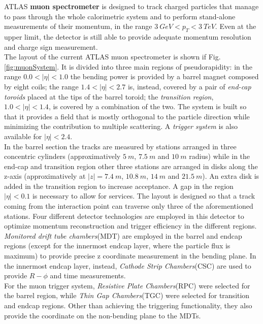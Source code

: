 \documentclass[a4paper,12pt]{article}
\begin{document}
ATLAS \textbf{muon spectrometer} is designed to track charged particles that manage to pass through the whole calorimetric system and to perform stand-alone measurements of their momentum, in the range 
$3\ GeV < p_{T} < 3\ TeV$. Even at the upper limit, the detector is still able to provide adequate momentum resolution and charge sign measurement.\\

The layout of the current  ATLAS muon spectrometer is shown if Fig. \ref{fig:muonSystem}. It is divided into three main regions of pseudorapidity: in the range $0.0 < |\eta| < 1.0$ the bending power
is provided by a barrel magnet composed by eight coils; the range $1.4 < |\eta| < 2.7$ is, instead, covered by a pair of \textit{end-cap toroids} placed at the tips of the barrel toroid; the \textit{transition
region}, $1.0 < |\eta| < 1.4$, is covered by a combination of the two. The system is built so that it provides a field that is mostly orthogonal to the particle direction while minimizing the contribution to multiple scattering. A \textit{trigger system} is also available for $|\eta| < 2.4$. \\

In the barrel section the tracks are measured by stations arranged in three concentric cylinders (approximatively $5\ m$, $7.5\ m$ and $10\ m$ radius) while in the end-cap and
transition region other three stations are arranged in disks along the z-axis (approximatively at  $|z| = 7.4\ m$, $10.8\ m$, $14\ m$ and $21.5\ m$). An extra disk is added in the transition
region to increase acceptance. A gap in the region $|\eta| < 0.1$ is necessary to allow for services. The layout is designed so that a track coming from the interaction point can traverse only three of the aforementioned stations.
Four different detector technologies are employed in this detector to optimize momentum reconstruction and trigger efficiency in the 
different regions.  \textit{Monitored drift tube chambers}(MDT) are employed in the barrel and endcap regions (except for the innermost endcap layer, where the particle flux is maximum) to provide precise z coordinate measurement in the bending plane. In the innermost endcap layer, instead, \textit{Cathode Strip Chambers}(CSC) are used to provide $R-\phi$ and time measurements. \\

For the muon trigger system, \textit{Resistive Plate Chambers}(RPC) were selected for the barrel region, while \textit{Thin Gap Chambers}(TGC) were selected for transition and endcap regions. Other
than achieving the triggering functionality, they also provide the coordinate on the non-bending plane to the MDTs. 
\end{document}
